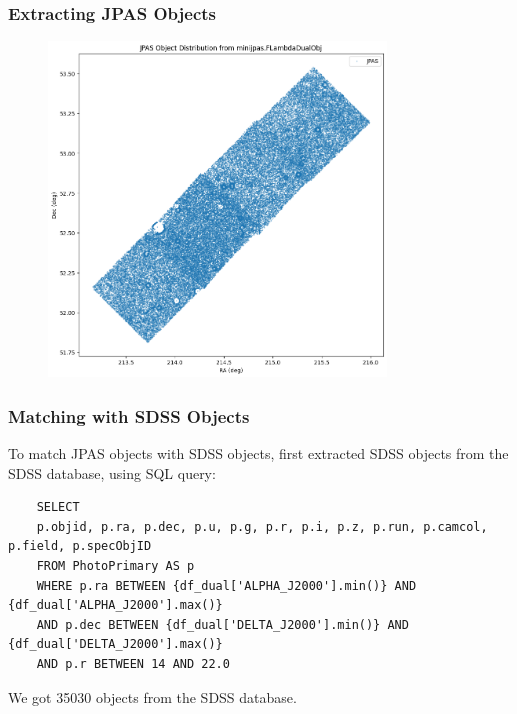 \documentclass{beamer}
\begin{document}
\begin{frame}
    \frametitle{Extracting JPAS Objects}
    \begin{figure}[h]
        \centering
        \includegraphics[width=0.8\textwidth]{../images/JPAS (FLambdaDualObj).png}
    \end{figure}
\end{frame}

\begin{frame}[fragile]
    \frametitle{Matching with SDSS Objects}
    To match JPAS objects with SDSS objects, first extracted SDSS objects from the SDSS database, using SQL query:
    \begin{lstlisting}
    SELECT 
    p.objid, p.ra, p.dec, p.u, p.g, p.r, p.i, p.z, p.run, p.camcol, p.field, p.specObjID 
    FROM PhotoPrimary AS p 
    WHERE p.ra BETWEEN {df_dual['ALPHA_J2000'].min()} AND {df_dual['ALPHA_J2000'].max()} 
    AND p.dec BETWEEN {df_dual['DELTA_J2000'].min()} AND {df_dual['DELTA_J2000'].max()} 
    AND p.r BETWEEN 14 AND 22.0
    \end{lstlisting}
    We got 35030 objects from the SDSS database.
\end{frame}
\end{document}
